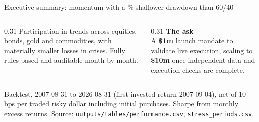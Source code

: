\documentclass[aspectratio=169,11pt]{beamer}
\newcommand{\src}[1]{\par\vfill{\scriptsize\color{muted}\sloppy #1\par}\vskip0.05cm}
\begin{document}
\begin{frame}[t]{Executive summary: momentum with a \DDReduction\% shallower drawdown than 60/40}
\begin{columns}[T,onlytextwidth]
\begin{column}{0.31\textwidth}
\footnotesize Participation in trends across equities, bonds, gold and commodities, with materially smaller losses in crises. Fully rules-based and auditable month by month.
\end{column}
\begin{column}{0.31\textwidth}
\small\textbf{\color{accent}The ask}\\[1pt]
\footnotesize A \textbf{\$1m} launch mandate to validate live execution, scaling to \textbf{\$10m} once independent data and execution checks are complete.
\end{column}
\end{columns}
\src{Backtest, 2007-08-31 to 2026-08-31 (first invested return 2007-09-04), net of 10 bps per traded risky dollar including initial purchases. Sharpe from monthly excess returns. Source: \texttt{outputs/tables/performance.csv}, \texttt{stress\_periods.csv}.}
\end{frame}
\end{document}
